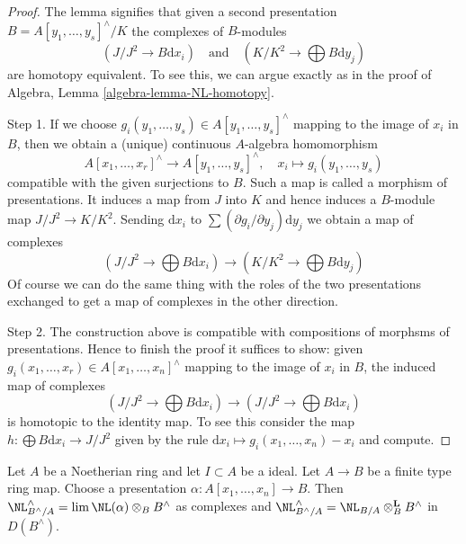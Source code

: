 \begin{proof}
The lemma signifies that given a second presentation
$B = A[y_1, \ldots, y_s]^\wedge / K$ the complexes of $B$-modules
$$
(J/J^2 \to B\text{d}x_i)
\quad\text{and}\quad
(K/K^2 \to \bigoplus B\text{d}y_j)
$$
are homotopy equivalent. To see this, we can argue exactly as in
the proof of Algebra, Lemma \ref{algebra-lemma-NL-homotopy}.

\medskip\noindent
Step 1. If we choose $g_i(y_1, \ldots, y_s) \in A[y_1, \ldots, y_s]^\wedge$
mapping to the image of $x_i$ in $B$, then we obtain a (unique) continuous
$A$-algebra homomorphism
$$
A[x_1, \ldots, x_r]^\wedge \to A[y_1, \ldots, y_s]^\wedge,\quad
x_i \mapsto g_i(y_1, \ldots, y_s)
$$
compatible with the given surjections to $B$. Such a map is called
a morphism of presentations. It induces a map from $J$ into $K$
and hence induces a $B$-module map $J/J^2 \to K/K^2$. Sending
$\text{d}x_i$ to $\sum (\partial g_i/\partial y_j)\text{d}y_j$
we obtain a map of complexes
$$
(J/J^2 \to \bigoplus B\text{d}x_i)
\longrightarrow
(K/K^2 \to \bigoplus B\text{d}y_j)
$$
Of course we can do the same thing with the roles of the two presentations
exchanged to get a map of complexes in the other direction.

\medskip\noindent
Step 2. The construction above is compatible with compositions of morphsms
of presentations. Hence to finish the proof it suffices to show: given
$g_i(x_1, \ldots, x_r) \in A[x_1, \ldots, x_n]^\wedge$
mapping to the image of $x_i$ in $B$, the induced map of complexes
$$
(J/J^2 \to \bigoplus B\text{d}x_i)
\longrightarrow
(J/J^2 \to \bigoplus B\text{d}x_i)
$$
is homotopic to the identity map. To see this consider the map
$h : \bigoplus B \text{d}x_i \to J/J^2$ given by the rule
$\text{d}x_i \mapsto g_i(x_1, \ldots, x_n) - x_i$ and compute.
\end{proof}

\begin{lemma}
\label{lemma-NL-is-completion}
Let $A$ be a Noetherian ring and let $I \subset A$ be a ideal.
Let $A \to B$ be a finite type ring map. Choose a presentation
$\alpha : A[x_1, \ldots, x_n] \to B$. Then
$\NL_{B^\wedge/A}^\wedge = \lim \NL(\alpha) \otimes_B B^\wedge$
as complexes and
$\NL_{B^\wedge/A}^\wedge = \NL_{B/A} \otimes_B^\mathbf{L} B^\wedge$
in $D(B^\wedge)$.
\end{lemma}

